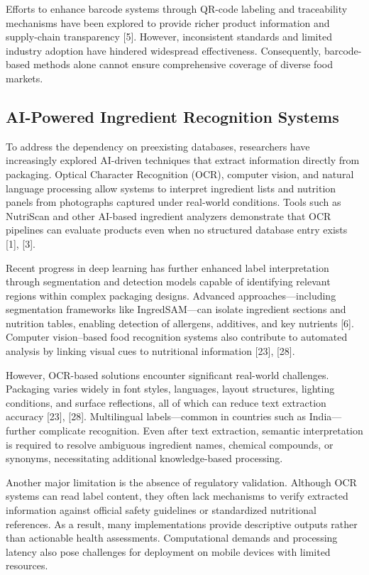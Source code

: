 \documentclass[conference]{IEEEtran}
\begin{document}
Efforts to enhance barcode systems through QR-code labeling and traceability mechanisms have been explored to provide richer product information and supply-chain transparency [5]. However, inconsistent standards and limited industry adoption have hindered widespread effectiveness. Consequently, barcode-based methods alone cannot ensure comprehensive coverage of diverse food markets.

\subsection{AI-Powered Ingredient Recognition Systems}

To address the dependency on preexisting databases, researchers have increasingly explored AI-driven techniques that extract information directly from packaging. Optical Character Recognition (OCR), computer vision, and natural language processing allow systems to interpret ingredient lists and nutrition panels from photographs captured under real-world conditions. Tools such as NutriScan and other AI-based ingredient analyzers demonstrate that OCR pipelines can evaluate products even when no structured database entry exists [1], [3].

Recent progress in deep learning has further enhanced label interpretation through segmentation and detection models capable of identifying relevant regions within complex packaging designs. Advanced approaches—including segmentation frameworks like IngredSAM—can isolate ingredient sections and nutrition tables, enabling detection of allergens, additives, and key nutrients [6]. Computer vision–based food recognition systems also contribute to automated analysis by linking visual cues to nutritional information [23], [28].

However, OCR-based solutions encounter significant real-world challenges. Packaging varies widely in font styles, languages, layout structures, lighting conditions, and surface reflections, all of which can reduce text extraction accuracy [23], [28]. Multilingual labels—common in countries such as India—further complicate recognition. Even after text extraction, semantic interpretation is required to resolve ambiguous ingredient names, chemical compounds, or synonyms, necessitating additional knowledge-based processing.

Another major limitation is the absence of regulatory validation. Although OCR systems can read label content, they often lack mechanisms to verify extracted information against official safety guidelines or standardized nutritional references. As a result, many implementations provide descriptive outputs rather than actionable health assessments. Computational demands and processing latency also pose challenges for deployment on mobile devices with limited resources.
\end{document}

